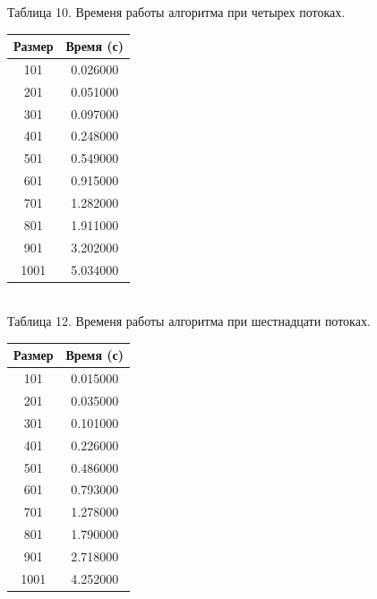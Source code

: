\documentclass[12pt]{report}
\begin{document}
	\begin{minipage}{0.5\textwidth}
		\begin{center}
			Таблица 10. Временя работы алгоритма при четырех потоках.
			
			\begin{tabular}{|c c|}
				\hline
				Размер & Время (с) \\
				\hline
				101 & 0.026000\\
				\hline
				201 & 0.051000\\
				\hline
				301 & 0.097000\\
				\hline
				401 & 0.248000\\
				\hline
				501 & 0.549000\\
				\hline
				601 & 0.915000\\
				\hline
				701 & 1.282000\\
				\hline
				801 & 1.911000\\
				\hline
				901 & 3.202000\\
				\hline
				1001 & 5.034000\\
				\hline
			\end{tabular}
			
			~\\
			
			Таблица 12. Временя работы алгоритма при шестнадцати потоках.
			
			\begin{tabular}{|c c|}
				\hline
				Размер & Время (с) \\
				\hline
				101 & 0.015000\\
				\hline
				201 & 0.035000\\
				\hline
				301 & 0.101000\\
				\hline
				401 & 0.226000\\
				\hline
				501 & 0.486000\\
				\hline
				601 & 0.793000\\
				\hline
				701 & 1.278000\\
				\hline
				801 & 1.790000\\
				\hline
				901 & 2.718000\\
				\hline
				1001 & 4.252000\\
				\hline
			\end{tabular}
		\end{center}
	\end{minipage}
	\hfill
\end{document}
